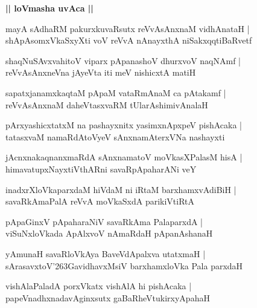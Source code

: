 \documentclass[twoside,12pt,openright]{book}
\def\S{\char'263}
\newcounter{shloka}[chapter]
\def\uvaca#1{\centerline{{\large\textbf{#1}}}}
\begin{document}
\uvaca{|| loVmasha uvAca ||}

\begin{shloka}
mayA sAdhaRM pakurxkuvaRsutx reVvAsAnxnaM vidhAnataH |\\
shApAsomxVkaSxyXti voV reVvA nAnayxthA niSakxqqtiBaRvetf
\end{shloka}

\begin{shloka}
shaqNuSAvxvahitoV viparx pApanashoV dhurxvoV naqNAmf |\\
reVvAsAnxneVna jAyeVta iti meV nishicxtA matiH 
\end{shloka}

\begin{shloka}
sapatxjanamxkaqtaM pApaM vataRmAnaM ca pAtakamf |\\
reVvAsAnxnaM daheVtasxvaRM tUlarAshimivAnalaH
\end{shloka}

\begin{shloka}
pArxyashicxtatxM na pashayxnitx yasimxnApxpeV pishAcaka |\\
tatasxvaM namaRdAtoVyeV sAnxnamAterxVNa nashayxti
\end{shloka}

\begin{shloka}
jAcnxnakaqnanxmaRdA sAnxnamatoV moVkasXPalasM hisA |\\
himavatupxNayxtiVthARni savaRpApaharANi veY
\end{shloka}

\begin{shloka}
inadxrXloVkaparxdaM hiVdaM ni iRtaM barxhamxvAdiBiH |\\
savaRkAmaPalA reVvA moVkaSxdA parikiVtiRtA 
\end{shloka}

\begin{shloka}
pApaGinxV pApaharaNiV savaRkAma PalaparxdA |\\
viSuNxloVkada ApAlxvoV nAmaRdaH pApanAshanaH 
\end{shloka}

\begin{shloka}
yAmunaH savaRloVkAya BaveVdApalxva utatxmaH |\\
sArasavxtoV\S GavidhavxMsiV barxhamxloVka Pala parxdaH 
\end{shloka}

\begin{shloka}
vishAlaPaladA porxVkatx vishAlA hi pishAcaka |\\
papeVnadhxnadavAginxsutx gaBaRheVtukirxyApahaH 
\end{shloka}
\end{document}
